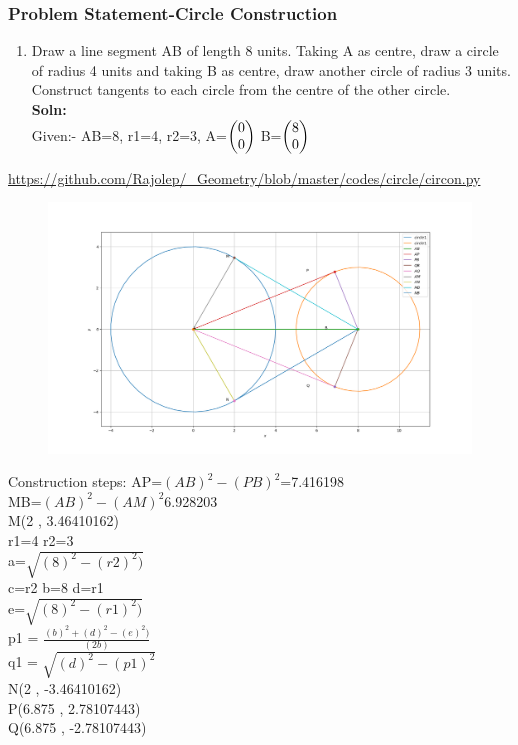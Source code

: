 \begin{frame}
\frametitle{Problem Statement-Circle Construction}
\begin{enumerate}[label=(\roman*)]
\item Draw a line segment AB of length 8 units. Taking A as centre, draw a circle of radius 4 units and taking B as centre, draw another circle of radius 3 units. Construct tangents to each circle from the centre of the other circle.\\
\textbf{Soln:}\\
Given:- AB=8, r1=4, r2=3, A=$\begin{pmatrix}0\\0\end{pmatrix}$ B=$\begin{pmatrix}8\\0\end{pmatrix}$\\
\end{enumerate}
\url{https://github.com/Rajolep/_Geometry/blob/master/codes/circle/circon.py}
\begin{figure}
\includegraphics[scale=0.15]{./figs/circon.png}
\end{figure}
\end{frame}
\begin{frame}
Construction steps:
AP=$(AB)^2-(PB)^2$=7.416198\\
MB=$(AB)^2-(AM)^2$6.928203\\
M(2 , 3.46410162)\\
r1=4  r2=3\\
a=$\sqrt{(8)^2-(r2)^2)}$\\
c=r2 b=8  d=r1\\
e=$\sqrt{(8)^2-(r1)^2)}$\\
p1 = $\frac{(b)^2 + (d)^2-(e)^2 )}{(2b)}$\\
q1 = $\sqrt{(d)^2-(p1)^2}$\\
N(2 , -3.46410162)\\
P(6.875 , 2.78107443)\\
Q(6.875 , -2.78107443)\\
\end{frame}
